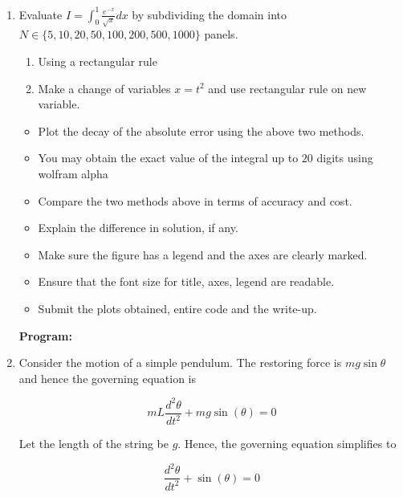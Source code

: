 \documentclass[a4paper,11pt]{report}
\begin{document}
\begin{enumerate}
    \item Evaluate $I = \displaystyle \int_{0}^{1} \frac{e^{-x}}{\sqrt{x}} dx$ by
    subdividing the domain into $N \in \{5, 10, 20, 50, 100, 200, 500, 1000\}$ panels.

    \begin{enumerate}
    \item Using a rectangular rule
    \item Make a change of variables $x = t^{2}$ and use rectangular rule on new variable.
    \end{enumerate}

    \begin{itemize}
    \item Plot the decay of the absolute error using the above two methods.
    \item You may obtain the exact value of the integral up to $20$ digits using wolfram alpha
    \item Compare the two methods above in terms of accuracy and cost.
    \item Explain the difference in solution, if any.
    \item Make sure the figure has a legend and the axes are clearly marked.
    \item Ensure that the font size for title, axes, legend are readable.
    \item Submit the plots obtained, entire code and the write-up.
    \end{itemize}

    \textbf{Program:}
    

    \begin{figure}[ht!]
    \centering
    \resizebox{0.9\linewidth}{!}{}
    \end{figure}

    \item Consider the motion of a simple pendulum. The restoring force is $mg \sin \theta$
    and hence the governing equation is

    \begin{equation*}
    mL \frac{d^{2} \theta}{dt^{2}} + mg \sin(\theta) = 0
    \end{equation*}

    Let the length of the string be $g$. Hence, the governing equation simplifies to
                    
    \begin{equation*}
    \frac{d^{2} \theta}{dt^{2}} + \sin(\theta) = 0
    \end{equation*}


\end{enumerate}
\end{document}
